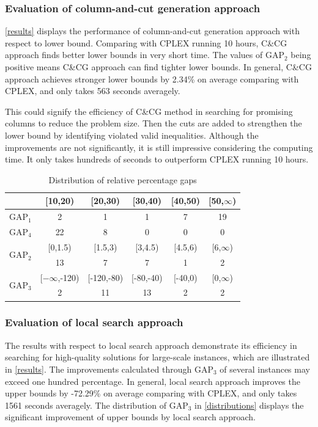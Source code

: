 \documentclass[11pt,nonblindrev,fleqn]{article}
\begin{document}
\subsubsection{Evaluation of column-and-cut generation approach}
\autoref{results} displays the performance of column-and-cut generation approach with respect to lower bound. Comparing with CPLEX running 10 hours, C\&CG approach finds better lower bounds in very short time. The values of GAP$_2$ being positive means C\&CG approach can find tighter lower bounds. In general, C\&CG approach achieves stronger lower bounds by 2.34\% on average comparing with CPLEX, and only takes 563 seconds averagely. 

This could signify the efficiency of C\&CG method in searching for promising columns to reduce the problem size. Then the cuts are added to strengthen the lower bound by identifying violated valid inequalities. Although the improvements are not significantly, it is still impressive considering the computing time. It only takes hundreds of seconds to outperform CPLEX running 10 hours.

\begin{table}[H]
\setlength{\abovecaptionskip}{-3pt}
\setlength{\belowcaptionskip}{5pt}
\centering
  \footnotesize
  \caption{Distribution of relative percentage gaps}
  \label{distributions}

\begin{tabular}{cccccc}
\hline
      & [10,20) & [20,30) & [30,40) & [40,50) & [50,$\infty$) \bigstrut\\
\hline
GAP$_1$ & 2     & 1     & 1     & 7     & 19 \bigstrut[t]\\
GAP$_4$ & 22    & 8     & 0     & 0     & 0 \bigstrut[b]\\
\hline
\multirow{2}[4]{*}{GAP$_2$} & [0,1.5) & [1.5,3) & [3,4.5) & [4.5,6) & [6,$\infty$) \bigstrut\\
\cline{2-6}      & 13    & 7     & 7     & 1     & 2 \bigstrut\\
\hline
\multirow{2}[4]{*}{GAP$_3$} & [$-\infty$,-120) & [-120,-80) & [-80,-40) & [-40,0) & [0,$\infty$) \bigstrut\\
\cline{2-6}      & 2     & 11    & 13    & 2     & 2 \bigstrut\\
\hline
\end{tabular}%

\end{table}%

\subsubsection{Evaluation of local search approach}
The results with respect to local search approach demonstrate its efficiency in searching for high-quality solutions for large-scale instances, which are illustrated in \autoref{results}. The improvements calculated through GAP$_3$ of several instances may exceed one hundred percentage. In general, local search approach improves the upper bounds by -72.29\% on average comparing with CPLEX, and only takes 1561 seconds averagely. The distribution of GAP$_3$ in \autoref{distributions} displays the significant improvement of upper bounds by local search approach.
\end{document}
